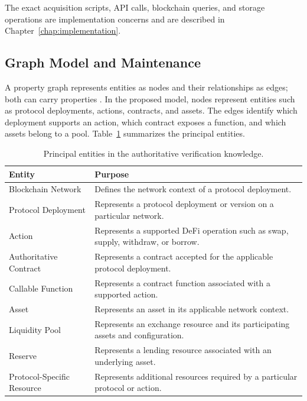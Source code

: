The exact acquisition scripts, API calls, blockchain queries, and storage
operations are implementation concerns and are described in Chapter~\ref{chap:implementation}.

\subsection{Graph Model and Maintenance}
A property graph represents entities as nodes and their relationships as
edges; both can carry properties \cite{angles2018propertygraph}. In the
proposed model, nodes represent entities such as protocol deployments,
actions, contracts, and assets. The edges identify which deployment
supports an action, which contract exposes a function, and which assets
belong to a pool. Table~\ref{tab:graph_entities} summarizes the principal
entities.

\begin{table}[H]
\centering
\caption{Principal entities in the authoritative verification knowledge.}
\label{tab:graph_entities}
\small
\begin{tabular}{p{} p{}}
\hline
\textbf{Entity} & \textbf{Purpose} \\
\hline

Blockchain Network &
Defines the network context of a protocol deployment. \\

Protocol Deployment &
Represents a protocol deployment or version on a particular network. \\

Action &
Represents a supported DeFi operation such as swap, supply, withdraw, or
borrow. \\

Authoritative Contract &
Represents a contract accepted for the applicable protocol deployment. \\

Callable Function &
Represents a contract function associated with a supported action. \\

Asset &
Represents an asset in its applicable network context. \\

Liquidity Pool &
Represents an exchange resource and its participating assets and
configuration. \\

Reserve &
Represents a lending resource associated with an underlying asset. \\

Protocol-Specific Resource &
Represents additional resources required by a particular protocol or action. \\

\hline
\end{tabular}
\end{table}

